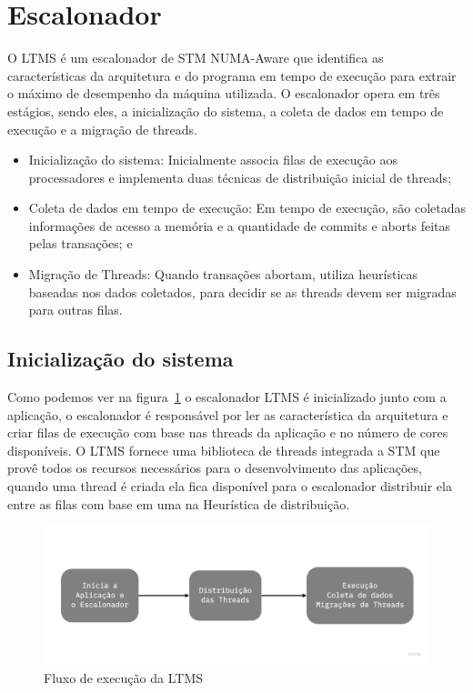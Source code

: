 \documentclass[diss,capa]{texufpel}
\begin{document}
\section{\textbf{Escalonador}}

O LTMS é um escalonador de STM NUMA-Aware que identifica as características da arquitetura e do programa em tempo de execução para extrair o máximo de desempenho da máquina utilizada. O escalonador opera em três estágios, sendo eles, a inicialização do sistema, a coleta de dados em tempo de execução e a migração de threads.

\begin{itemize}
 \item Inicialização do sistema: Inicialmente associa filas de execução aos processadores e implementa duas técnicas de distribuição inicial de threads;
 \item Coleta de dados em tempo de execução: Em tempo de execução, são coletadas informações de acesso a memória e a quantidade de commits e aborts feitas pelas transações; e
 \item Migração de Threads: Quando transações abortam, utiliza heurísticas baseadas nos dados coletados, para decidir se as threads devem ser migradas para outras filas.
\end{itemize}


\subsection{Inicialização do sistema}
\label{inicializacao}

Como podemos ver na figura~\ref{ltms_generic} o escalonador LTMS é inicializado junto com a aplicação, o escalonador é responsável por ler as característica da arquitetura e criar filas de execução com base nas threads da aplicação e no número de cores disponíveis. O LTMS fornece uma biblioteca de threads integrada a STM que provê todos os recursos necessários para o desenvolvimento das aplicações, quando uma thread é criada ela fica disponível para o escalonador distribuir ela entre as filas com base em uma na Heurística de distribuição.

\begin{figure}[htbp]
 \centering \includegraphics[scale=.25]{images/ltms_generic}
\caption{Fluxo de execução da LTMS}
\label{ltms_generic}
\end{figure}
\end{document}
